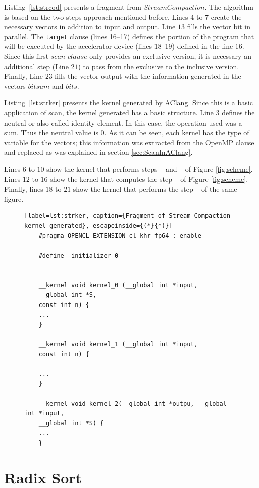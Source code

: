 \documentclass[Ingles]{ic-tese-v1}
\newcommand{\ttt}[1]{{\texttt{#1}}}
\newcommand{\rlst}[1]{Listing~\ref{lst:#1}}
\begin{document}
\rlst{strcod}  presents a fragment from $Stream Compaction$. The algorithm is based on the two steps approach mentioned before.
Lines $4$ to $7$ create the necessary vectors in addition to input and output.
Line $13$ fills the vector bit in parallel. The \ttt{target} clause (lines 16--17) defines the portion of the program  that will be executed by the accelerator device (lines 18--19) defined in the line $16$.
Since this first $scan$ $clause$ only provides an exclusive version, it is necessary an additional step (Line $21$) to pass from the exclusive to the inclusive version. Finally, Line $23$ fills the vector output with the information generated in the vectors $bitsum$ and $bits$.

\rlst{strker} presents the kernel generated by AClang. Since this is  a basic application of scan, the kernel generated has a basic structure. Line $3$ defines the neutral or also called identity element. In this case, the operation used was a sum. Thus the neutral value is $0$. As it can be seen, each kernel has the type of variable for the vectors; this information was extracted from the OpenMP clause and replaced as was explained in  section \ref{sec:ScanInAClang}.

Lines $6$ to $10$ show the kernel that performs steps ~ and ~ of Figure \ref{fig:scheme}. Lines $12$ to $16$ show the kernel that computes the step ~ of Figure \ref{fig:scheme}. Finally, lines $18$ to $21$ show the kernel that performs the step ~ of the same figure.

\begin{figure}[t]
	\lstset{basicstyle=\scriptsize}
	\begin{lstlisting}[label=lst:strker, caption={Fragment of Stream Compaction kernel generated}, escapeinside={(*}{*)}]
	#pragma OPENCL EXTENSION cl_khr_fp64 : enable

	#define _initializer 0


	__kernel void kernel_0 (__global int *input,
	__global int *S,
	const int n) {
	...
	}

	__kernel void kernel_1 (__global int *input,
	const int n) {

	...
	}

	__kernel void kernel_2(__global int *outpu, __global int *input,
	__global int *S) {
	...
	}
	\end{lstlisting}
\end{figure}

\section{Radix Sort}
\label{sec:Quicksort}
\end{document}
